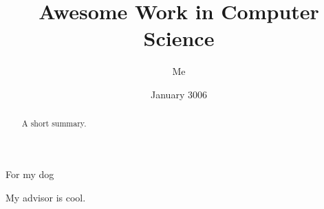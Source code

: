 \documentclass[12pt]{cmuthesis}
\begin{document}
 
\frontmatter

\pagestyle{empty}

\title{ %
{\bf Awesome Work in Computer Science}}
\author{Me}
\date{January 3006}
\trnumber{}


\support{}
\disclaimer{}



\maketitle

\begin{dedication}
For my dog
\end{dedication}

\pagestyle{plain} %


\begin{abstract}
A short summary.
\end{abstract}

\begin{acknowledgments}
My advisor is cool.
\end{acknowledgments}



\tableofcontents
\listoffigures
\listoftables

\mainmatter


%
%
%
%
%
\end{document}
